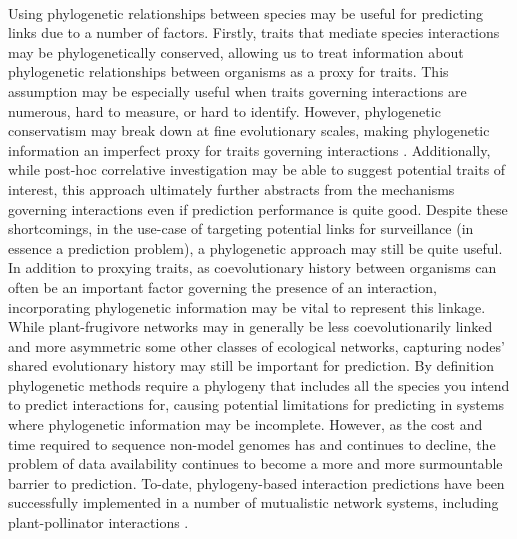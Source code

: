 \documentclass[num-refs]{wiley-article}%
\begin{document}
\paragraph*{}
Using phylogenetic relationships between species may be useful for predicting links due to a number of factors. Firstly, traits that mediate species interactions may be phylogenetically conserved, allowing us to treat information about phylogenetic relationships between organisms as a proxy for traits. This assumption may be especially useful when traits governing interactions are numerous, hard to measure, or hard to identify. However, phylogenetic conservatism may break down at fine evolutionary scales, making phylogenetic information an imperfect proxy for traits governing interactions \cite{rafferty2013}. Additionally, while post-hoc correlative investigation may be able to suggest potential traits of interest, this approach ultimately further abstracts from the mechanisms governing interactions even if prediction performance is quite good. Despite these shortcomings, in the use-case of targeting potential links for surveillance (in essence a prediction problem), a phylogenetic approach may still be quite useful. In addition to proxying traits, as coevolutionary history between organisms can often be an important factor governing the presence of an interaction, incorporating phylogenetic information may be vital to represent this linkage. While plant-frugivore networks may in generally be less coevolutionarily linked and more asymmetric some other classes of ecological networks\cite{maglianesi2024phylogenetic, jordano1987patterns, wheelwright1982seed}, capturing nodes' shared evolutionary history may still be important for prediction. By definition phylogenetic methods require a phylogeny that includes all the species you intend to predict interactions for, causing potential limitations for predicting in systems where phylogenetic information may be incomplete. However, as the cost and time required to sequence non-model genomes has and continues to decline, the problem of data availability continues to become a more and more surmountable barrier to prediction. To-date, phylogeny-based interaction predictions have been successfully implemented in a number of mutualistic network systems, including plant-pollinator interactions \cite{Braga21}.
\end{document}
